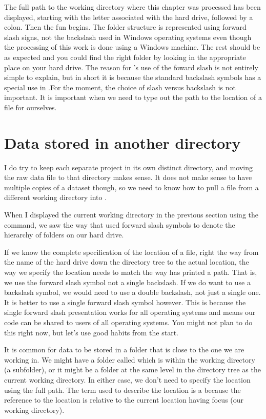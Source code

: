 The full path to the working directory where this chapter was processed has been displayed, starting with the letter associated with the hard drive, followed by a colon. Then the fun begins. The folder structure is represented using forward slash signs, not the backslash used in Windows operating systems even though the processing of this work is done using a Windows machine. The rest should be as expected and you could find the right folder by looking in the appropriate place on your hard drive. The reason for \R{}'s use of the foward slash is not entirely simple to explain, but in short it is because the standard backslash symbols has a special use  in \R{}.For the moment, the choice of slash versus backslash is not important. It is important when we need to type out the path to the location of a file for ourselves. 
 
 
 
\section{Data stored in another directory} 
 
 
I do try to keep each separate project in its own distinct directory, and moving the raw data file to that directory makes sense. It does not make sense to have multiple copies of a dataset though, so we need to know how to pull a file from a different working directory into \R{}. 
 
When I displayed the current working directory in the previous section using the  command, we saw the way that \R{} used forward slash symbols to denote the hierarchy of folders on our hard drive. 
 
If we know the complete specification of the location of a file, right the way from the name of the hard drive down the directory tree to the actual location, the way we specify the location needs to match the way \R{} has printed a path. That is, we use the forward slash symbol not a single backslash. If we do want to use a backslash symbol, we would need to use a double backslash, not just a single one. It is better to use a single forward slash symbol however. This is because the single forward slash presentation works for all operating systems and means our code can be shared to users of all operating systems. You might not plan to do this right now, but let's use good habits from the start. 
 
It is common for data to be stored in a folder that is close to the one we are working in. We might have a folder called  which is within the working directory (a subfolder), or it might be a folder at the same level in the directory tree as the current working directory. In either case, we don't need to specify the location using the full path. The term used to describe the location is a  because the reference to the location is relative to the current location having focus (our working directory).  
 
